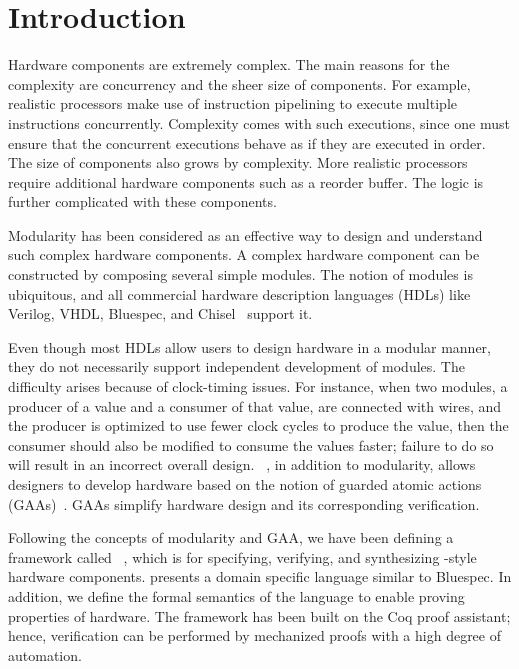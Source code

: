 \chapter{Introduction}

Hardware components are extremely complex. The main reasons for the
complexity are concurrency and the sheer size of components. For
example, realistic processors make use of instruction pipelining to
execute multiple instructions concurrently. Complexity comes with such
executions, since one must ensure that the concurrent executions
behave as if they are executed in order. The size of components also
grows by complexity. More realistic processors require additional
hardware components such as a reorder buffer. The logic is further
complicated with these components.

Modularity has been considered as an effective way to design and
understand such complex hardware components. A complex hardware
component can be constructed by composing several simple modules. The
notion of modules is ubiquitous, and all commercial hardware
description languages (HDLs) like Verilog, VHDL, Bluespec, and
Chisel~\cite{verilog, vhdl, bsdef, chisel} support it.

Even though most HDLs allow users to design hardware in a modular
manner, they do not necessarily support independent development of
modules. The difficulty arises because of clock-timing issues. For
instance, when two modules, a producer of a value and a consumer of
that value, are connected with wires, and the producer is optimized to
use fewer clock cycles to produce the value, then the consumer should
also be modified to consume the values faster; failure to do so will
result in an incorrect overall design. \Bluespec{}~\cite{bsdef,
  bsref}, in addition to modularity, allows designers to develop
hardware based on the notion of guarded atomic actions
(GAAs)~\cite{daniel-gaa}. GAAs simplify hardware design and its
corresponding verification.

Following the concepts of modularity and GAA, we have been defining a
framework called \Kami{}~\cite{kami-web, murali-thesis}, which is for
specifying, verifying, and synthesizing \Bluespec{}-style hardware
components. \Kami{} presents a domain specific language similar to
Bluespec. In addition, we define the formal semantics of the \Kami{}
language to enable proving properties of hardware. The framework has
been built on the Coq proof assistant; hence, verification can be
performed by mechanized proofs with a high degree of automation.

